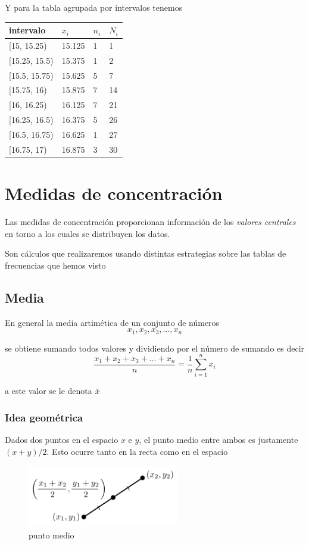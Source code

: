 \documentclass[
]{article}
\begin{document}
Y para la tabla agrupada por intervalos tenemos

\begin{longtable}[]{@{}llll@{}}
\toprule
intervalo & \(x_i\) & \(n_i\) & \(N_i\)\tabularnewline
\midrule
\endhead
{[}15, 15.25) & 15.125 & 1 & 1\tabularnewline
{[}15.25, 15.5) & 15.375 & 1 & 2\tabularnewline
{[}15.5, 15.75) & 15.625 & 5 & 7\tabularnewline
{[}15.75, 16) & 15.875 & 7 & 14\tabularnewline
{[}16, 16.25) & 16.125 & 7 & 21\tabularnewline
{[}16.25, 16.5) & 16.375 & 5 & 26\tabularnewline
{[}16.5, 16.75) & 16.625 & 1 & 27\tabularnewline
{[}16.75, 17) & 16.875 & 3 & 30\tabularnewline
\bottomrule
\end{longtable}

\hypertarget{medidas-de-concentraciuxf3n}{%
\section{Medidas de concentración}\label{medidas-de-concentraciuxf3n}}

Las medidas de concentración proporcionan información de los
\emph{valores centrales} en torno a los cuales se distribuyen los datos.

Son cálculos que realizaremos usando distintas estrategias sobre las
tablas de frecuencias que hemos visto

\hypertarget{media}{%
\subsection{Media}\label{media}}

En general la media artimética de un conjunto de números
\[x_1, x_2, x_3,\ldots , x_n\]

se obtiene sumando todos valores y dividiendo por el número de sumando
es decir
\[\frac{x_1 + x_2 + x_3 +\ldots  + x_n}{n} = \frac{1}{n}\sum^{n}_{i=1} x_i\]

a este valor se le denota \(\overline x\)

\hypertarget{idea-geomuxe9trica}{%
\subsubsection{Idea geométrica}\label{idea-geomuxe9trica}}

Dados dos puntos en el espacio \(x\) e \(y\), el punto medio entre ambos
es justamente \((x+y)/2\). Esto ocurre tanto en la recta como en el
espacio

\begin{figure}
\centering
\includegraphics[width=2.60417in,height=\textheight]{img/middle_point.png}
\caption{punto medio}
\end{figure}
\end{document}
